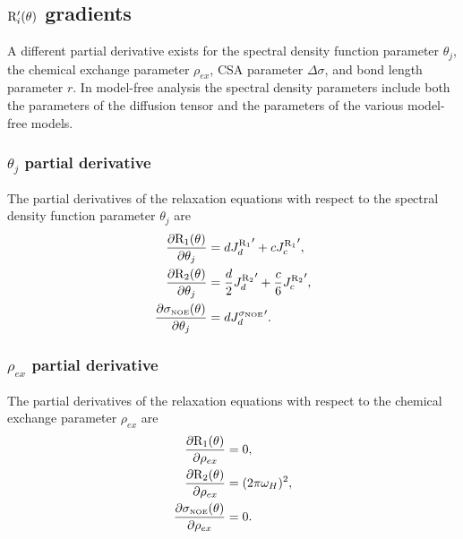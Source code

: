 
\subsection{$\mathrm{R}_i'(\theta)$ gradients}

A different partial derivative exists for the spectral density function parameter $\theta_j$, the chemical exchange parameter $\rho_{ex}$, CSA parameter $\Delta\sigma$, and bond length parameter $r$.  In model-free analysis the spectral density parameters include both the parameters of the diffusion tensor and the parameters of the various model-free models.


\subsubsection{$\theta_j$ partial derivative}

The partial derivatives of the relaxation equations with respect to the spectral density function parameter $\theta_j$ are
\begin{subequations}
\begin{align}
    \frac{\partial \mathrm{R}_1(\theta)}{\partial \theta_j} &= d {J_d^{\mathrm{R}_1}}' + c {J_c^{\mathrm{R}_1}}',                      \label{eq: Ri': dR1/dmf} \\
    \frac{\partial \mathrm{R}_2(\theta)}{\partial \theta_j} &= \frac{d}{2} {J_d^{\mathrm{R}_2}}' + \frac{c}{6} {J_c^{\mathrm{R}_2}}',  \label{eq: Ri': dR2/dmf} \\
    \frac{\partial \sigma_{\scriptscriptstyle \mathrm{NOE}}(\theta)}{\partial \theta_j} &= d {J_d^{\sigma_{\scriptscriptstyle \mathrm{NOE}}}}'.                         \label{eq: Ri': dsigmaNOE/dmf}
\end{align}
\end{subequations}


\subsubsection{$\rho_{ex}$ partial derivative}

The partial derivatives of the relaxation equations with respect to the chemical exchange parameter $\rho_{ex}$ are
\begin{subequations}
\begin{align}
    \frac{\partial \mathrm{R}_1(\theta)}{\partial \rho_{ex}} &= 0,          \label{eq: Ri': dR1/dRex} \\
    \frac{\partial \mathrm{R}_2(\theta)}{\partial \rho_{ex}} &= (2 \pi \omega_H)^2,          \label{eq: Ri': dR2/dRex} \\
    \frac{\partial \sigma_{\scriptscriptstyle \mathrm{NOE}}(\theta)}{\partial \rho_{ex}} &= 0.   \label{eq: Ri': dsigmaNOE/dRex}
\end{align}
\end{subequations}


